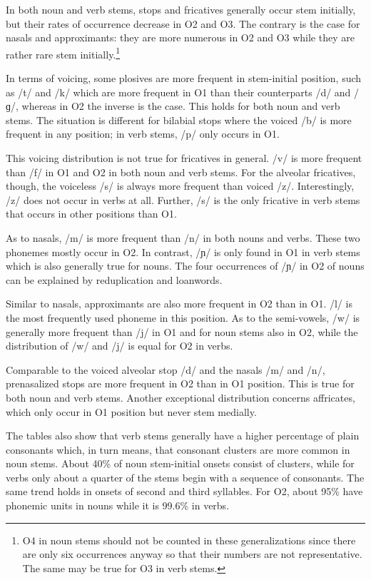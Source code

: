 In both noun and verb stems, stops and fricatives generally occur stem initially, but their rates of occurrence decrease in O2 and O3. The contrary is the case for nasals and approximants: they are more numerous in O2 and O3 while they are rather rare stem initially.\footnote{O4 in noun stems should not be counted in these generalizations since there are only six occurrences anyway so that their numbers are not representative. The same may be true for O3 in verb stems.} 

In terms of voicing, some plosives are more frequent in stem-initial position, such as /t/ and /k/ which are more frequent in O1 than their counterparts /d/ and /ɡ/, whereas in O2 the inverse is the case. This holds for both noun and verb stems. The situation is different for bilabial stops where the voiced /b/ is more frequent in any position; in verb stems, /p/ only occurs in O1.

This voicing distribution is not true for fricatives in general. /v/ is more frequent than /f/ in O1 and O2 in both noun and verb stems. For the alveolar fricatives, though, the voiceless /s/ is always more frequent than voiced /z/. Interestingly, /z/ does not occur in verbs at all. Further, /s/ is the only fricative in verb stems that occurs in other positions than O1.

As to nasals, /m/ is more frequent than /n/ in both nouns and verbs. These two phonemes mostly occur in O2. In contrast, /ɲ/ is only found in O1 in verb stems which is also generally true for nouns. The four occurrences  of /ɲ/ in O2 of nouns can be explained by reduplication and loanwords.

Similar to nasals, approximants are also more frequent in O2 than in O1. /l/ is the most frequently used phoneme in this position. As to the semi-vowels, /w/ is generally more frequent than /j/ in O1 and for noun stems also in O2, while the distribution of /w/ and /j/ is equal for O2 in verbs.

Comparable to the voiced alveolar stop /d/ and the nasals /m/ and /n/, prenasalized stops are more frequent in O2 than in O1 position. This is true for both noun and verb stems. Another exceptional distribution concerns affricates, which only occur in O1 position but never stem medially. 

The tables also show that verb stems generally have a higher percentage of plain consonants which, in turn means, that consonant clusters are more common in noun stems. About 40\% of noun stem-initial onsets consist of clusters, while for verbs only about a quarter of the stems begin with a sequence of consonants. The same trend holds in onsets of second and third syllables. For O2, about 95\% have phonemic units in nouns while it is 99.6\% in verbs.

